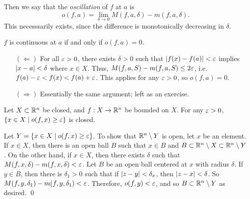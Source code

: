 Then we say that the \textit{oscillation} of $f$ at $a$ is
\[ o(f, a) = \lim_{\delta \to 0} M(f, a, \delta) - m(f, a, \delta). \]
This necesssarily exists, since the difference is monotonically decreasing in $\delta$.
\begin{simplelemma}
    $f$ is continuous at $a$ if and only if $o(f, a) = 0$.
\end{simplelemma}
\begin{itemize}
    \item[$(\Leftarrow)$] For all $\varepsilon > 0$, there exists $\delta > 0$ such that $\left\lvert f(x) - f(a) \right\rvert < \varepsilon$ implies $\left\lvert x - a \right\rvert < \delta$ where $x \in X$. Thus, $M(f, a, S) - m(f, a, S) \leq 2 \varepsilon$, i.e. $f(a) - \varepsilon < f(x) < f(a) + \varepsilon$. This applies for any $\varepsilon > 0$, so $o(f, a) = 0$.
    \item[$(\Rightarrow)$] Essentially the same argument; left as an exercise.
\end{itemize}
\begin{simpleprop}
    Let $X \subset \mathbb R^n$ be closed, and $f : X \to \mathbb R^n$ be bounded on $X$. For any $\varepsilon > 0$, $\{x \in X \mid o(f, x) \geq \varepsilon\}$ is closed.
\end{simpleprop}
\noindent Let $Y = \{x \in X \mid o(f, x) \geq \varepsilon\}$. To show that $\mathbb R^n \setminus Y$ is open, let $x$ be an element. If $x \in X$, then there is an open ball $B$ such that $x \in B$ and $B \subset \mathbb R^n \setminus X \subset \mathbb R^n \setminus Y$. On the other hand, if $x \in X$, then there exists $\delta$ such that $M(f, x, \delta) - m(f, x, \delta) < \varepsilon$. Let $B$ be an open ball centered at $x$ with radius $\delta$. If $y \in B$, then there is $\delta_1 > 0$ such that if $\left\lvert z - y \right\rvert < \delta_{x}$, then $\left\lvert z - x \right\rvert < \delta$. So $M(f, y, \delta_1) - m(f, y, \delta_1) < \varepsilon$. Therefore, $o(f, y) < \varepsilon$, and so $B \subset \mathbb R^n \setminus Y$ as desired. \qed